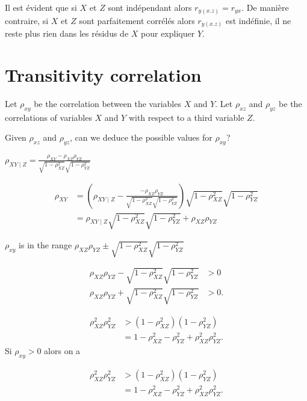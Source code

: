 \documentclass[
]{report}
\begin{document}
Il est évident que si \(X\) et \(Z\) sont indépendant alors \(r_{y(x.z)}= r_{yx}\). De manière contraire, si \(X\) et \(Z\) sont parfaitement corrélés alors \(r_{y(x.z)}\) est indéfinie, il ne reste plus rien dans les résidus de \(X\) pour expliquer \(Y\).

\hypertarget{transitivity-correlation}{%
\section{Transitivity correlation}\label{transitivity-correlation}}

Let \(\rho_{xy}\) be the correlation between the variables \(X\) and \(Y\). Let \(\rho_{xz}\) and \(\rho_{yz}\) be the correlations of variables \(X\) and \(Y\) with respect to a third variable \(Z\).

Given \(\rho_{xz}\) and \(\rho_{yz}\), can we deduce the possible values for \(\rho_{xy}\)?

\(\rho_{XY \mid Z}={\frac {\rho_{XY}-\rho _{XZ}\rho_{YZ}}{{\sqrt {1-\rho_{XZ}^{2}}}{\sqrt {1-\rho_{YZ}^{2}}}}}\)

\begin{align*}
  \rho_{XY} 
  &=  \left( \rho_{XY \mid Z} - \frac{ - \rho_{XZ} \rho_{YZ}}{\sqrt{1 - \rho_{XZ}^{2}} \sqrt{1 - \rho_{YZ}^{2}}} \right)  \sqrt{1 - \rho_{XZ}^{2}} \sqrt{1 - \rho_{YZ}^{2}}  \\
  &=  \rho_{XY \mid Z} \sqrt{1 - \rho_{XZ}^{2}} \sqrt{1 - \rho_{YZ}^{2}} +  \rho_{XZ} \rho_{YZ}
\end{align*}

\(\rho_{xy}\) is in the range \(\rho_{XZ} \rho_{YZ} \pm \sqrt{1 - \rho_{XZ}^{2}} \sqrt{1 - \rho_{YZ}^{2}}\)

\begin{align*}
  \rho_{XZ} \rho_{YZ} - \sqrt{1 - \rho_{XZ}^{2}} \sqrt{1 - \rho_{YZ}^{2}} &> 0 \\
  \rho_{XZ} \rho_{YZ} + \sqrt{1 - \rho_{XZ}^{2}} \sqrt{1 - \rho_{YZ}^{2}} &> 0 .
\end{align*}

\begin{align*}
  \rho_{XZ}^2 \rho_{YZ}^2 
  &> \left ( 1 - \rho_{XZ}^{2}\right ) \left (1 - \rho_{YZ}^{2}\right ) \\
  &= 1 - \rho_{XZ}^{2} - \rho_{YZ}^{2} + \rho_{XZ}^2 \rho_{YZ}^2 .
\end{align*}
Si \(\rho_{xy}>0\) alors on a

\begin{align*}
  \rho_{XZ}^2 \rho_{YZ}^2 
  &> \left ( 1 - \rho_{XZ}^{2}\right ) \left (1 - \rho_{YZ}^{2}\right ) \\
  &= 1 - \rho_{XZ}^{2} - \rho_{YZ}^{2} + \rho_{XZ}^2 \rho_{YZ}^2 .
\end{align*}
\end{document}
